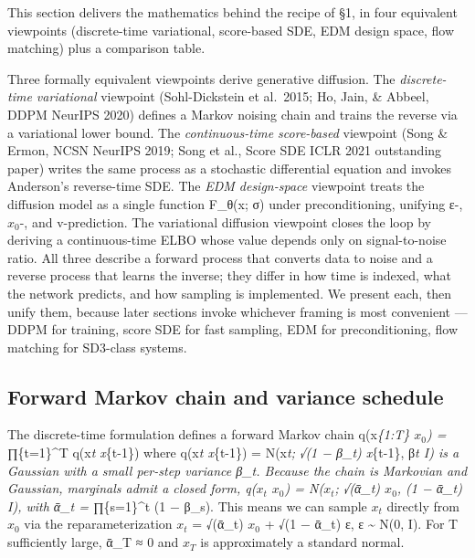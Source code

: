 \documentclass{article}
\begin{document}
This section delivers the mathematics behind the recipe of §1, in four equivalent viewpoints (discrete-time variational, score-based SDE, EDM design space, flow matching) plus a comparison table.

Three formally equivalent viewpoints derive generative diffusion. The \emph{discrete-time variational} viewpoint (Sohl-Dickstein et al.~2015; Ho, Jain, \& Abbeel, DDPM NeurIPS 2020) defines a Markov noising chain and trains the reverse via a variational lower bound. The \emph{continuous-time score-based} viewpoint (Song \& Ermon, NCSN NeurIPS 2019; Song et al., Score SDE ICLR 2021 outstanding paper) writes the same process as a stochastic differential equation and invokes Anderson's reverse-time SDE. The \emph{EDM design-space} viewpoint \citep{karras2022elucidatingthedesi} treats the diffusion model as a single function F\_θ(x; σ) under preconditioning, unifying ε-, \(x_0\)-, and v-prediction. The variational diffusion viewpoint \citep{kingma2021variationaldiffusi} closes the loop by deriving a continuous-time ELBO whose value depends only on signal-to-noise ratio. All three describe a forward process that converts data to noise and a reverse process that learns the inverse; they differ in how time is indexed, what the network predicts, and how sampling is implemented. We present each, then unify them, because later sections invoke whichever framing is most convenient --- DDPM for training, score SDE for fast sampling, EDM for preconditioning, flow matching for SD3-class systems.

\subsection{Forward Markov chain and variance schedule}\label{forward-markov-chain-and-variance-schedule}

The discrete-time formulation defines a forward Markov chain q(x\emph{\{1:T\} \textbar{} \(x_0\)) = ∏}\{t=1\}\^{}T q(x\emph{t \textbar{} x}\{t-1\}) where q(x\emph{t \textbar{} x}\{t-1\}) = N(x\emph{t; √(1 − β\_t) x}\{t-1\}, β\emph{t I) is a Gaussian with a small per-step variance β\_t. Because the chain is Markovian and Gaussian, marginals admit a closed form, q(\(x_t\) \textbar{} \(x_0\)) = N(\(x_t\); √(ᾱ\_t) \(x_0\), (1 − ᾱ\_t) I), with ᾱ\_t = ∏}\{s=1\}\^{}t (1 − β\_s). This means we can sample \(x_t\) directly from \(x_0\) via the reparameterization \(x_t\) = √(ᾱ\_t) \(x_0\) + √(1 − ᾱ\_t) ε, ε \textasciitilde{} N(0, I). For T sufficiently large, ᾱ\_T ≈ 0 and \(x_T\) is approximately a standard normal.
\end{document}
